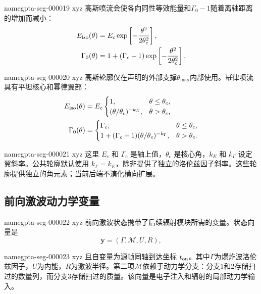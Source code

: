 \documentclass[twocolumn]{aastex702}
\makeatletter
\providecommand{\gptareaderanchor}[1]{\pdfdest name{#1} xyz}%
\providecommand{\gptareaderanchor}[1]{\special{pdf:dest (#1) [ @thispage /XYZ @xpos @ypos null ]}}%
\makeatother
\begin{document}
\gptareaderanchor{gpta-seg-000019}%
高斯喷流会使各向同性等效能量和\(\Gamma_0-1\)随着离轴距离的增加而减小：
\begin{equation}
\begin{aligned}
E_{\rm iso}(\theta) &=
E_c\exp\left[-\frac{\theta^2}{2\theta_c^2}\right],\\
\Gamma_0(\theta) &=
1+(\Gamma_c-1)\exp\left[-\frac{\theta^2}{2\theta_c^2}\right],
\end{aligned}
\end{equation}

\gptareaderanchor{gpta-seg-000020}%
高斯轮廓仅在声明的外部支撑\(\theta_{\max}\)内部使用。幂律喷流具有平坦核心和幂律翼部：
\begin{equation}
\begin{aligned}
E_{\rm iso}(\theta) &=
E_c
\begin{cases}
1, & \theta\le \theta_c,\\
(\theta/\theta_c)^{-k_E}, & \theta>\theta_c,
\end{cases}\\
\Gamma_0(\theta) &=
\begin{cases}
\Gamma_c, & \theta\le \theta_c,\\
1+(\Gamma_c-1)(\theta/\theta_c)^{-k_\Gamma}, & \theta>\theta_c .
\end{cases}
\end{aligned}
\end{equation}

\gptareaderanchor{gpta-seg-000021}%
这里 \(E_c\) 和 \(\Gamma_c\) 是轴上值，\(\theta_c\) 是核心角，\(k_E\) 和 \(k_\Gamma\) 设定翼斜率。公共轮廓默认使用 \(k_\Gamma=k_E\)，除非提供了独立的洛伦兹因子斜率。这些轮廓提供独立的角元素；当前后端不演化横向扩展。

\subsection{前向激波动力学变量}


\gptareaderanchor{gpta-seg-000022}%
前向激波状态携带了后续辐射模块所需的变量。状态向量是
\begin{equation}
\mathbf{y}=(\Gamma,\mathcal{M},U,R),
\end{equation}

\gptareaderanchor{gpta-seg-000023}%
且自变量为源帧同轴到达坐标
\(t_{\rm on}\)。其中\(\Gamma\)为爆炸波洛伦兹因子，\(U\)为内能，\(R\)为激波半径。第二项\(\mathcal{M}\)依赖于动力学分支：分支1和2存储扫过的数量列，而分支3存储扫过的质量。该向量是电子注入和辐射的局部动力学输入。
\end{document}
